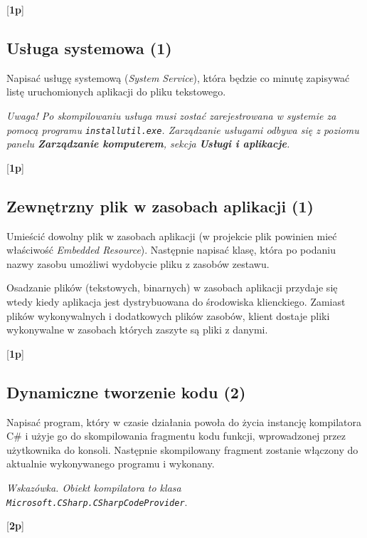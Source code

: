     [{\bf 1p}]

\subsection{Usługa systemowa (1)}

    Napisać usługę systemową ({\em System Service}), która będzie co minutę zapisywać listę
\label{system_service}	
    uruchomionych aplikacji do pliku tekstowego. 
    
    {\em Uwaga! Po skompilowaniu usługa musi zostać zarejestrowana w systemie
    za pomocą programu {\tt installutil.exe}. Zarządzanie usługami odbywa się z poziomu
    panelu {\bf Zarządzanie komputerem}, sekcja {\bf Usługi i aplikacje}.}
    
    [{\bf 1p}]

\subsection{Zewnętrzny plik w zasobach aplikacji (1)}

    Umieścić dowolny plik w zasobach aplikacji (w projekcie plik powinien mieć właściwość {\em Embedded Resource}). Następnie napisać klasę, która po
\label{plik_w_zasobach}	
	podaniu nazwy zasobu
    umożliwi wydobycie pliku z zasobów zestawu.
	
	Osadzanie plików (tekstowych, binarnych) w zasobach aplikacji przydaje się wtedy kiedy aplikacja jest dystrybuowana do środowiska klienckiego. Zamiast
	plików wykonywalnych i dodatkowych plików zasobów, klient dostaje pliki wykonywalne w zasobach których zaszyte są pliki z danymi.
        
    [{\bf 1p}]

\subsection{Dynamiczne tworzenie kodu (2)}

    Napisać program, który w czasie działania powoła do życia instancję kompilatora C\# i użyje go do skompilowania fragmentu kodu
	funkcji, wprowadzonej przez użytkownika do konsoli. Następnie skompilowany fragment zostanie włączony do aktualnie wykonywanego programu i wykonany.
	
	{\em Wskazówka. Obiekt kompilatora to klasa {\tt Microsoft.CSharp.CSharpCodeProvider}}.

    [{\bf 2p}]
